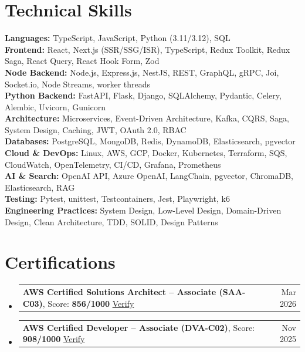 \documentclass[letterpaper,10pt]{extarticle}
\makeatletter
\newcommand{\resumeProjectHeading}[2]{
  \item
  \begin{tabular*}{0.97\textwidth}{l@{\extracolsep{\fill}}r}
    \small #1 & \small #2 \\
  \end{tabular*}\vspace{-6pt}
}
\newcommand{\resumeSubHeadingListStart}{\begin{itemize}[leftmargin=0.10in, label={}]}
\newcommand{\resumeSubHeadingListEnd}{\end{itemize}}
\makeatother
\begin{document}
\section{Technical Skills}
\vspace{2pt}
{\small
\noindent\textbf{Languages:} TypeScript, JavaScript, Python (3.11/3.12), SQL \\[2pt]
\textbf{Frontend:} React, Next.js (SSR/SSG/ISR), TypeScript, Redux Toolkit, Redux Saga, React Query, React Hook Form, Zod \\[2pt]
\textbf{Node Backend:} Node.js, Express.js, NestJS, REST, GraphQL, gRPC, Joi, Socket.io, Node Streams, worker threads \\[2pt]
\textbf{Python Backend:} FastAPI, Flask, Django, SQLAlchemy, Pydantic, Celery, Alembic, Uvicorn, Gunicorn \\[2pt]
\textbf{Architecture:} Microservices, Event-Driven Architecture, Kafka, CQRS, Saga, System Design, Caching, JWT, OAuth 2.0, RBAC \\[2pt]
\textbf{Databases:} PostgreSQL, MongoDB, Redis, DynamoDB, Elasticsearch, pgvector \\[2pt]
\textbf{Cloud \& DevOps:} Linux, AWS, GCP, Docker, Kubernetes, Terraform, SQS, CloudWatch, OpenTelemetry, CI/CD, Grafana, Prometheus \\[2pt]
\textbf{AI \& Search:} OpenAI API, Azure OpenAI, LangChain, pgvector, ChromaDB, Elasticsearch, RAG \\[2pt]
\textbf{Testing:} Pytest, unittest, Testcontainers, Jest, Playwright, k6 \\[2pt]
\textbf{Engineering Practices:} System Design, Low-Level Design, Domain-Driven Design, Clean Architecture, TDD, SOLID, Design Patterns
\par}

\section{Certifications}
\vspace{2pt}
\resumeSubHeadingListStart
  \resumeProjectHeading
    {\textbf{AWS Certified Solutions Architect -- Associate (SAA-C03)}, Score: \textbf{856/1000} \textbar{} \href{https://cp.certmetrics.com/amazon/en/public/verify/credential/5f3fb78e66b744618e580b11bb01bdaa}{Verify}}{Mar 2026}
  \resumeProjectHeading
    {\textbf{AWS Certified Developer -- Associate (DVA-C02)}, Score: \textbf{908/1000} \textbar{} \href{https://cp.certmetrics.com/amazon/en/public/verify/credential/beb59ede67a24c84aa64cae05f567a6e}{Verify}}{Nov 2025}
\resumeSubHeadingListEnd
\end{document}
